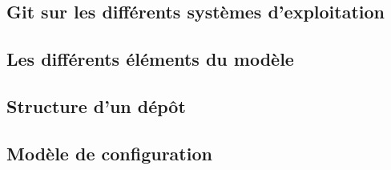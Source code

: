 
\subsection{Git sur les différents systèmes d'exploitation}\label{GitOS} %

\subsection{Les différents éléments du modèle} %



\subsection{Structure d'un dépôt} %

\subsection{Modèle de configuration} %
